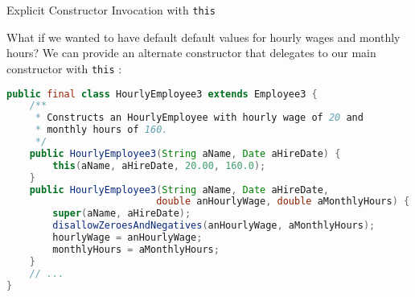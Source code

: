 \documentclass{beamer}
\begin{document}







\begin{frame}[fragile]{Explicit Constructor Invocation with {\tt this}}


What if we wanted to have default default values for hourly wages and monthly hours?  We can provide an alternate constructor that delegates to our main constructor with {\tt this} :
\begin{lstlisting}[language=Java]
public final class HourlyEmployee3 extends Employee3 {
    /**
     * Constructs an HourlyEmployee with hourly wage of 20 and
     * monthly hours of 160.
     */
    public HourlyEmployee3(String aName, Date aHireDate) {
        this(aName, aHireDate, 20.00, 160.0);
    }
    public HourlyEmployee3(String aName, Date aHireDate,
                          double anHourlyWage, double aMonthlyHours) {
        super(aName, aHireDate);
        disallowZeroesAndNegatives(anHourlyWage, aMonthlyHours);
        hourlyWage = anHourlyWage;
        monthlyHours = aMonthlyHours;
    }
    // ...
}
\end{lstlisting}

\end{frame}
\end{document}

